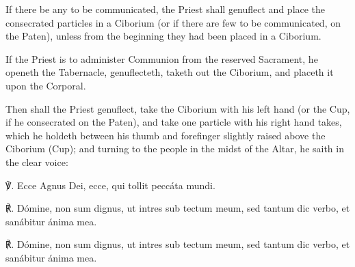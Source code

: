 \begin{rubric}
    If there be any to be communicated, the Priest shall genuflect and place the consecrated particles in a Ciborium (or if there are few to be communicated, on the Paten), unless from the beginning they had been placed in a Ciborium.
\end{rubric}
\begin{rubric}
    If the Priest is to administer Communion from the reserved Sacrament, he openeth the Tabernacle, genuflecteth, taketh out the Ciborium, and placeth it upon the Corporal.
\end{rubric}
\begin{rubric}
    Then shall the Priest genuflect, take the Ciborium with his left hand (or the Cup, if he consecrated on the Paten), and take one particle with his right hand takes, which he holdeth between his thumb and forefinger slightly raised above the Ciborium (Cup); and turning to the people in the midst of the Altar, he saith in the clear voice:
\end{rubric}
℣. Ecce Agnus Dei, ecce, qui tollit peccáta mundi.

℟. Dómine, non sum dignus, ut intres sub tectum meum, sed tantum dic verbo, et sanábitur ánima mea.

℟. Dómine, non sum dignus, ut intres sub tectum meum, sed tantum dic verbo, et sanábitur ánima mea.

